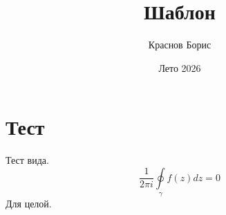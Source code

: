 \documentclass[12pt,a4paper]{article} %
\author{Краснов Борис} %
\title{Шаблон} %
\date{Лето 2026} %
\begin{document}
	\maketitle
	\tableofcontents
	\clearpage
	
	\section{Тест}
	Тест вида.
	$$\frac{1}{2\pi i}\oint\limits_{\gamma}f(z)dz=0$$
	Для целой.
\end{document}
